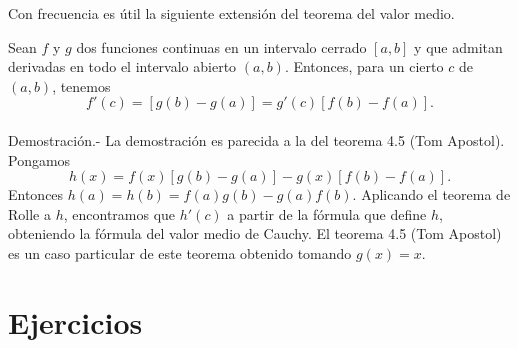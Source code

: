 Con frecuencia es útil la siguiente extensión del teorema del valor medio.\\

\begin{teo}
    Sean $f$ y $g$ dos funciones continuas en un intervalo cerrado $[a,b]$ y que admitan derivadas en todo el intervalo abierto $(a,b)$. Entonces, para un cierto $c$ de $(a,b)$, tenemos
    $$f'(c)=[g(b)-g(a)]=g'(c)[f(b)-f(a)].$$\\
	Demostración.- La demostración es parecida a la del teorema 4.5 (Tom Apostol). Pongamos 
	$$h(x)=f(x)[g(b)-g(a)]-g(x)[f(b)-f(a)].$$
	Entonces $h(a)=h(b)=f(a)g(b)-g(a)f(b)$. Aplicando el teorema de Rolle a $h$, encontramos que $h'(c)$ a partir de la fórmula que define $h$, obteniendo la fórmula del valor medio de Cauchy. El teorema 4.5 (Tom Apostol) es un caso particular de este teorema obtenido tomando $g(x)=x.$\\
\end{teo}


\section{Ejercicios}

